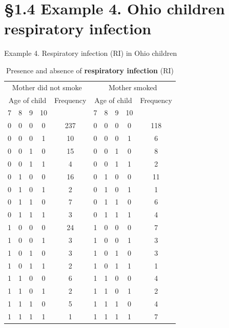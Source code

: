 \documentclass{beamer}
\newcommand{\currentsection}{}
\let\oldsection\section
\renewcommand{\section}[1]{\oldsection{#1}\renewcommand{\currentsection}{#1}}
\begin{document}
\section{\S1.4 Example 4. Ohio children respiratory infection}\label{sec:Ex4}
\begin{frame}{Example 4. Respiratory infection (RI) in Ohio children }
\begin{table} [!htbp]
\caption{Presence and absence of {\bf respiratory infection} (RI) \label{tab1.4}}
\begin{center}
\begin{scriptsize}
\begin{tabular}{|ccccc|ccccc|}
\hline
\multicolumn{5}{|c|}{Mother did not smoke} & \multicolumn{5}{c|}{Mother smoked}  \\
\multicolumn{4}{|c}{Age of child} & Frequency & \multicolumn{4}{c}{Age of child} & Frequency \\
7 & 8 & 9 & 10 & & 7 & 8 & 9 & 10 & \\ \hline
0 & 0 & 0 & 0& 237 & 0 & 0 & 0 & 0& 118 \\
0 & 0 & 0 & 1 & 10 & 0 & 0 & 0 & 1& 6 \\
0 & 0 & 1 & 0& 15 & 0 & 0 & 1 & 0& 8 \\
0 & 0 & 1 & 1& 4 & 0 & 0 & 1 & 1 & 2 \\ \hline
0 & 1 & 0 & 0& 16 & 0 & 1 & 0 & 0& 11 \\
0 & 1 & 0 & 1 & 2 & 0 & 1 & 0 & 1& 1 \\
0 & 1 & 1 & 0& 7 & 0 & 1 & 1 & 0& 6 \\
0 & 1 & 1 & 1& 3 & 0 & 1 & 1 & 1 & 4 \\ \hline
1& 0 & 0 & 0& 24 & 1 & 0 & 0 & 0& 7 \\
1 & 0 & 0 & 1 & 3 & 1 & 0 & 0 & 1& 3 \\
1 & 0 & 1 & 0& 3 & 1 & 0 & 1 & 0& 3 \\
1 & 0 & 1 & 1& 2 & 1 & 0 & 1 & 1 & 1 \\ \hline
1 & 1 & 0 & 0& 6 & 1 & 1 & 0 & 0& 4 \\
1 & 1 & 0 & 1 & 2 & 1 & 1 & 0 & 1& 2 \\
1 & 1 & 1 & 0& 5 &  1 & 1 & 1 & 0& 4 \\
1 & 1 & 1 & 1& 1 & 1 & 1 & 1 & 1 & 7 \\ \hline
\end{tabular}
\end{scriptsize}
\end{center}
\end{table}
\end{frame}
\end{document}

